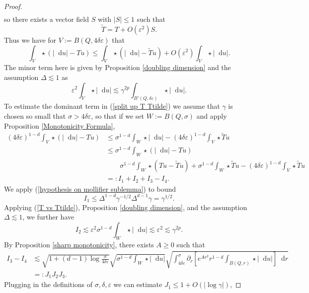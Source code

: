 \documentclass[reqno,12pt,letterpaper]{amsart}
\newcommand*\dif{\mathop{}\!\mathrm{d}}
\theoremstyle{definition}
\numberwithin{equation}{section}
\begin{document}
\begin{proof}
\begin{align*}
\end{align*}
so there exists a vector field $S$ with $|S| \leq 1$ such that 
\begin{equation}\label{T vs Ttilde}
\tilde T = T + O(\varepsilon^2)S.
\end{equation}
Thus we have for $V := B(Q, 4\delta\varepsilon)$ that 
\begin{equation}\label{split up T Ttilde}
\int_V \star (|\dif u| - Tu) \leq \int_V \star (|\dif u| - \tilde Tu) + O(\varepsilon^2) \int_V \star |\dif u|.
\end{equation}
The minor term here is given by Proposition \ref{doubling dimension} and the assumption $\Delta \lesssim 1$ as
$$\varepsilon^2 \int_V \star |\dif u| \lesssim \gamma^{2p} \int_{B'(Q, \delta\varepsilon)} \star |\dif u|.$$
To estimate the dominant term in (\ref{split up T Ttilde}) we assume that $\gamma$ is chosen so small that $\sigma > 4\delta\varepsilon$, so that if we set $W := B(Q, \sigma)$ and apply Proposition \ref{Monotonicity Formula},
\begin{align*}
(4\delta\varepsilon)^{1 - d} \int_V \star(|\dif u| - Tu)
&\leq \sigma^{1 - d}\int_W \star |\dif u| - (4\delta\varepsilon)^{1 - d}\int_V \star \tilde Tu\\
&\leq \sigma^{1 - d}\int_W \star(|\dif u| - Tu) \\
&\qquad \sigma^{1 - d} \int_W \star(Tu - \tilde Tu) + \sigma^{1 - d}\int_W \star \tilde Tu - (4\delta\varepsilon)^{1 - d}\int_V \star \tilde Tu\\
&=: I_1 + I_2 + I_3 - I_4.
\end{align*}
We apply (\ref{hypothesis on mollifier sublemma}) to bound
$$I_1 \leq \Delta^{1 - d} \gamma^{-1/2} \Delta^{d - 1} \gamma = \gamma^{1/2}.$$
Applying (\ref{T vs Ttilde}), Proposition \ref{doubling dimension}, and the assumption $\Delta \lesssim 1$, we further have 
$$I_2 \lesssim \varepsilon^2 \sigma^{1 - d} \int_W \star |\dif u| \lesssim \varepsilon^2 \lesssim \gamma^{2p}.$$
By Proposition \ref{sharp monotonicity}, there exists $A \geq 0$ such that
\begin{align*}
I_3 - I_4 &\lesssim \sqrt{1 + (d - 1) \log \frac{\sigma}{4\delta\varepsilon}} \sqrt{\sigma^{1 - d} \int_W \star |\dif u|} \sqrt{\int_{4\delta\varepsilon}^\sigma \partial_r \left[e^{Ar^2} r^{1 - d} \int_{B(Q, r)} \star |\dif u|\right] \dif r}\\
&=: J_1 J_2 J_3.
\end{align*}
Plugging in the definitions of $\sigma, \delta, \varepsilon$ we can estimate $J_1 \leq 1 + O(|\log \gamma|)$,

\end{proof}
\end{document}
